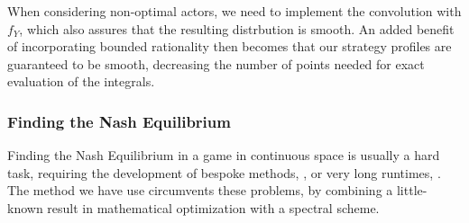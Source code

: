 When considering non-optimal actors, we need to implement the convolution with $f_Y$, which also assures that the resulting distrbution is smooth. An added benefit of incorporating bounded rationality then becomes that our strategy profiles are guaranteed to be smooth, decreasing the number of points needed for exact evaluation of the integrals.


\subsubsection*{Finding the Nash Equilibrium}
Finding the Nash Equilibrium in a game in continuous space is usually a hard task, requiring the development of bespoke methods, \citep{verticalmigration}, or very long runtimes, \citep{jerome}. The method we have use circumvents these problems, by combining a little-known result in mathematical optimization with a spectral scheme.


